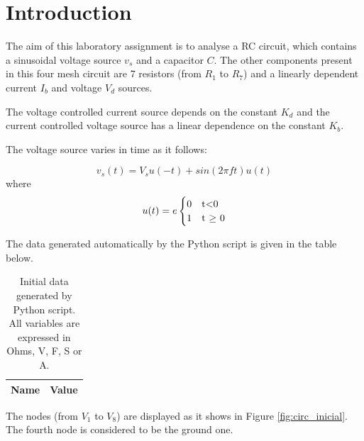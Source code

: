 \section{Introduction}
\label{introduction}


\par The aim of this laboratory assignment is to analyse a RC circuit, which contains a sinusoidal voltage source $v_s$ and a capacitor $C$. The other components present in this four mesh circuit are 7 resistors (from $R_1$ to $R_7$) and a linearly dependent current $I_b$ and voltage $V_d$ sources.
\par The voltage controlled current source depends on the constant $K_d$ and the current controlled voltage source has a linear dependence on the constant $K_b$.

\par The voltage source varies in time as it follows:

\begin{equation}
	v_s(t) = V_s u(-t) + sin(2 \pi f t)u(t)
	\label {equation:n1}
\end{equation}
where
\begin{equation}
	u(t)=e
	\begin{cases}
		0 & $t$ < $0$ \\
		1 & $t $\geq$ 0$
	\end{cases}
	\label {eq:n2}
\end{equation}

\par The data generated automatically by the Python script is given in the table below.

\begin{table}[ht]
  \centering
  \begin{tabular}{|l|r|}
    \hline    
    {\bf Name} & {\bf Value} \\ \hline
    
  \end{tabular}
  \caption{Initial data generated by Python script. All variables are expressed in Ohms, V, F, S or A.}
  \label{tab:initial_data}
\end{table}



\par The nodes (from $V_1$ to $V_8$) are displayed as it shows in Figure \ref{fig:circ_inicial}. The fourth node is considered to be the ground one.


\par 
   

